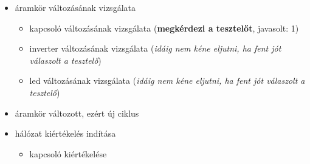 {\begin{itemize}
\begin{itemize}
\begin{itemize}
\setlength{\itemsep}{0cm}%
\setlength{\parskip}{0cm}%
\setlength{\itemindent}{-25pt}%
	\item kapcsoló kiértékelése
	\begin{itemize}
	\setlength{\itemsep}{0cm}%
	\setlength{\parskip}{0cm}%
	\setlength{\itemindent}{-35pt}%
		\item kapcsoló állapotának lekérdezése (\textbf{megkérdezi a tesztelőt}, javasolt: 1)
		\item kapcsoló értékének kiadása a vezetékre
	\end{itemize}
	\item inverter kiértékelése
	\begin{itemize}
	\setlength{\itemsep}{0cm}%
	\setlength{\parskip}{0cm}%
	\setlength{\itemindent}{-35pt}%
		\item bemenet lekérdezése (\textbf{megkérdezi a tesztelőt}, javasolt: 1)
		\item kimenet kiadása a vezetékre (\textbf{megkérdezi a tesztelőt}, javasolt: 0)
	\end{itemize}\item led kiértékelése
	\begin{itemize}
	\setlength{\itemsep}{0cm}%
	\setlength{\parskip}{0cm}%
	\setlength{\itemindent}{-35pt}%
		\item led bemenetének lekérdezése (\textbf{megkérdezi a tesztelőt}, javasolt: 0)
		\item bemenettől függően világít/nem világít.
	\end{itemize}
\end{itemize}
\item áramkör változásának vizsgálata
\begin{itemize}
\setlength{\itemsep}{0cm}%
\setlength{\parskip}{0cm}%
\setlength{\itemindent}{-25pt}%
	\item kapcsoló változásának vizsgálata (\textbf{megkérdezi a tesztelőt}, javasolt: 1)
	\item inverter változásának vizsgálata (\textit{idáig nem kéne eljutni, ha fent jót válaszolt a tesztelő})
	\item led változásának vizsgálata (\textit{idáig nem kéne eljutni, ha fent jót válaszolt a tesztelő})
\end{itemize}
\item áramkör változott, ezért új ciklus
\item hálózat kiértékelés indítása
\begin{itemize}
\setlength{\itemsep}{0cm}%
\setlength{\parskip}{0cm}%
\setlength{\itemindent}{-25pt}%
	\item kapcsoló kiértékelése

\end{itemize}
\end{itemize}
\end{itemize}}
